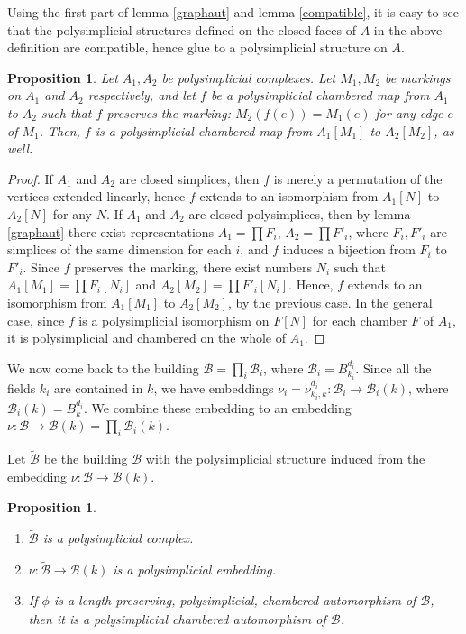 \documentclass{amsart}
\theoremstyle{theorem}
\theoremstyle{lemma}
\theoremstyle{prop}
\newtheorem{prop}[lemma]{Proposition}
\theoremstyle{definition}
\theoremstyle{corollary}
\theoremstyle{remark}
\newcommand{\B}{\mathcal{B}}
\begin{document}
Using the first part of lemma \ref{graphaut} and lemma \ref{compatible}, it is easy to see that the polysimplicial structures defined on the closed faces of $A$ in the above definition are compatible, hence glue to a polysimplicial structure on $A$. 

\begin{prop}\label{extend} Let $A_1, A_2$ be polysimplicial complexes. Let $M_1, M_2$ be markings on $A_1$ and $A_2$ respectively, and let $f$ be a polysimplicial chambered map from $A_1$ to $A_2$ such that $f$ preserves the marking: $M_2(f(e))=M_1(e)$ for any edge $e$ of $M_1$. Then, $f$ is a polysimplicial chambered map from $A_1[M_1]$ to $A_2[M_2]$, as well. \end{prop} 
\begin{proof} If $A_1$ and $A_2$ are closed simplices, then $f$ is merely a permutation of the vertices extended linearly, hence $f$ extends to an isomorphism from $A_1[N]$ to $A_2[N]$ for any $N$. If $A_1$ and $A_2$ are closed polysimplices, then by lemma \ref{graphaut} there exist representations $A_1=\prod F_i$, $A_2 = \prod F'_i$, where $F_i, F'_i$ are simplices of the same dimension for each $i$, and $f$ induces a bijection from $F_i$ to $F'_i$. Since $f$ preserves the marking, there exist numbers $N_i$ such that $A_1[M_1]=\prod F_i[N_i]$ and $A_2[M_2]=\prod F'_i[N_i]$. Hence, $f$ extends to an isomorphism from $A_1[M_1]$ to $A_2[M_2]$, by the previous case. In the general case, since $f$ is a polysimplicial isomorphism on $F[N]$ for each chamber $F$ of $A_1$, it is polysimplicial and chambered on the whole of $A_1$. \end{proof}

We now come back to the building $\B=\prod_i{\B_i}$, where $\B_i=B^{d_i}_{k_i}$. Since all the fields $k_i$ are contained in $k$, we have embeddings $\nu_i=\nu^{d_i}_{k_i,k}:\B_i \rightarrow \B_i(k)$, where $\B_i(k)=B^{d_i}_k$. We combine these embedding to an embedding 
$\nu:\B\rightarrow \B(k)=\prod_i \B_i(k)$. 

Let $\tilde{\B}$ be the building $\B$ with the polysimplicial structure induced from the embedding $\nu: \B \rightarrow \B(k)$.

\begin{prop}\label{subdivide}
\begin{enumerate}
\item $\tilde{\B}$ is a polysimplicial complex. 
\item $\nu:\tilde{\B} \rightarrow \B(k)$ is a polysimplicial embedding.
\item If $\phi$ is a length preserving, polysimplicial, chambered automorphism of $\B$, then it is a polysimplicial chambered automorphism of $\tilde{\B}$.
\end{enumerate}
\end{prop}
\end{document}
